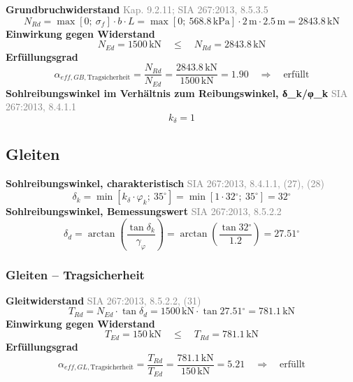 \documentclass[11pt,a4paper]{article}
\newcommand{\normref}[1]{{\small\textcolor{gray}{#1}}}
\begin{document}
\noindent\textbf{Grundbruchwiderstand} \hfill \normref{Kap. 9.2.11; SIA 267:2013, 8.5.3.5}
\begin{equation*}
N_{Rd} = \max\left[0;\ \sigma_f\right] \cdot b \cdot L = \max\left[0;\ 568.8\,\mathrm{kPa}\right] \cdot 2\,\mathrm{m} \cdot 2.5\,\mathrm{m} = 2843.8\,\mathrm{kN}
\end{equation*}
\noindent\textbf{Einwirkung gegen Widerstand}
\begin{equation*}
N_{Ed} = 1500\,\mathrm{kN} \quad \le \quad N_{Rd} = 2843.8\,\mathrm{kN}
\end{equation*}
\noindent\textbf{Erfüllungsgrad}
\begin{equation*}
\alpha_{eff,GB,\text{Tragsicherheit}} = \frac{N_{Rd}}{N_{Ed}} = \frac{2843.8\,\mathrm{kN}}{1500\,\mathrm{kN}} = 1.90 \quad \Rightarrow \quad \text{erfüllt}
\end{equation*}
\noindent\textbf{Sohlreibungswinkel im Verhältnis zum Reibungswinkel, δ\_k/φ\_k} \hfill \normref{SIA 267:2013, 8.4.1.1}
\begin{equation*}
k_{\delta} = 1
\end{equation*}
\subsection{Gleiten}
\noindent\textbf{Sohlreibungswinkel, charakteristisch} \hfill \normref{SIA 267:2013, 8.4.1.1, (27), (28)}
\begin{equation*}
\delta_k = \min\left[k_{\delta} \cdot \varphi_k;\ 35^\circ\right] = \min\left[1 \cdot 32{}^{\circ};\ 35^\circ\right] = 32{}^{\circ}
\end{equation*}
\noindent\textbf{Sohlreibungswinkel, Bemessungswert} \hfill \normref{SIA 267:2013, 8.5.2.2}
\begin{equation*}
\delta_d = \arctan\left(\frac{\tan \delta_k}{\gamma_{\varphi}}\right) = \arctan\left(\frac{\tan 32{}^{\circ}}{1.2}\right) = 27.51{}^{\circ}
\end{equation*}
\subsubsection{Gleiten – Tragsicherheit}
\noindent\textbf{Gleitwiderstand} \hfill \normref{SIA 267:2013, 8.5.2.2, (31)}
\begin{equation*}
T_{Rd} = N_{Ed} \cdot \tan \delta_d = 1500\,\mathrm{kN} \cdot \tan 27.51{}^{\circ} = 781.1\,\mathrm{kN}
\end{equation*}
\noindent\textbf{Einwirkung gegen Widerstand}
\begin{equation*}
T_{Ed} = 150\,\mathrm{kN} \quad \le \quad T_{Rd} = 781.1\,\mathrm{kN}
\end{equation*}
\noindent\textbf{Erfüllungsgrad}
\begin{equation*}
\alpha_{eff,GL,\text{Tragsicherheit}} = \frac{T_{Rd}}{T_{Ed}} = \frac{781.1\,\mathrm{kN}}{150\,\mathrm{kN}} = 5.21 \quad \Rightarrow \quad \text{erfüllt}
\end{equation*}
\end{document}
